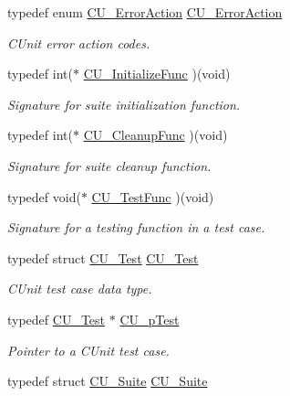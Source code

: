 \begin{DoxyCompactItemize}
\item 
typedef enum \hyperlink{group___framework_ga50053b4edbfc96a88027dd57c580ca35}{C\+U\+\_\+\+Error\+Action} \hyperlink{group___framework_gab68a2bd9fee7d73f79c0cfc68c576b3a}{C\+U\+\_\+\+Error\+Action}
\begin{DoxyCompactList}\small\item\em C\+Unit error action codes. \end{DoxyCompactList}\item 
typedef int($\ast$ \hyperlink{group___framework_gaab4b8ad3aa3a3c222c43c8a330de11e3}{C\+U\+\_\+\+Initialize\+Func} )(void)
\begin{DoxyCompactList}\small\item\em Signature for suite initialization function. \end{DoxyCompactList}\item 
typedef int($\ast$ \hyperlink{group___framework_ga90966c0bede742195897c3aeff4c342b}{C\+U\+\_\+\+Cleanup\+Func} )(void)
\begin{DoxyCompactList}\small\item\em Signature for suite cleanup function. \end{DoxyCompactList}\item 
typedef void($\ast$ \hyperlink{group___framework_ga5868148b642b30635b8fe7f095c5b493}{C\+U\+\_\+\+Test\+Func} )(void)
\begin{DoxyCompactList}\small\item\em Signature for a testing function in a test case. \end{DoxyCompactList}\item 
typedef struct \hyperlink{struct_c_u___test}{C\+U\+\_\+\+Test} \hyperlink{group___framework_ga0bc6468b9781a574e2c7994ca700ee1e}{C\+U\+\_\+\+Test}
\begin{DoxyCompactList}\small\item\em C\+Unit test case data type. \end{DoxyCompactList}\item 
typedef \hyperlink{struct_c_u___test}{C\+U\+\_\+\+Test} $\ast$ \hyperlink{group___framework_ga249c43fbe4e53452b3f90db1437da04b}{C\+U\+\_\+p\+Test}
\begin{DoxyCompactList}\small\item\em Pointer to a C\+Unit test case. \end{DoxyCompactList}\item 
typedef struct \hyperlink{struct_c_u___suite}{C\+U\+\_\+\+Suite} \hyperlink{group___framework_gad58d2b18d7da9c0ae48ae1679d1b8861}{C\+U\+\_\+\+Suite}

\end{DoxyCompactItemize}
